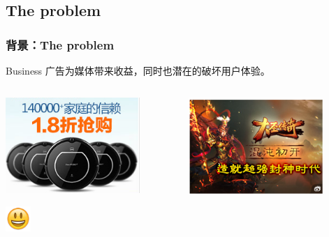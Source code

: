 \documentclass{beamer}
\begin{document}
\subsection{The problem}
\begin{frame}
\frametitle{背景：The problem}

  \begin{block}{Business}
   广告为媒体带来收益，同时也潜在的破坏用户体验。
  \end{block}

  \pause

  \begin{columns}[T]
    \begin{column}{.5\textwidth}
      \begin{center}
      \includegraphics[width=0.8\textwidth]{img/good_ad.png}
      \end{center}
      \begin{center}
      \includegraphics[width=0.15\textwidth]{img/emoji_smiley.png}
      \end{center}
    \end{column}
    \begin{column}{.5\textwidth}
      \begin{center}
      \includegraphics[width=0.8\textwidth]{img/bad_ad.png}

\end{center}
\end{column}
\end{columns}
\end{frame}
\end{document}

